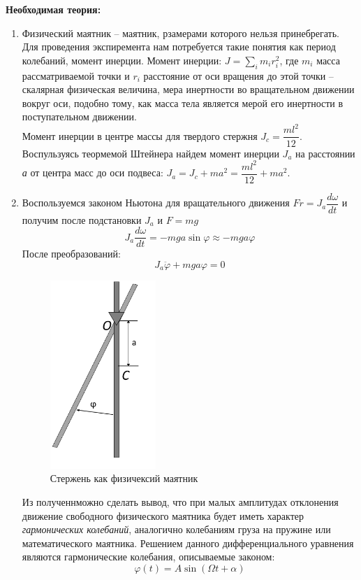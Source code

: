 \documentclass[a4paper, 12pt]{article}
\begin{document}
\textbf{Необходимая теория:}
\begin{enumerate}
\item Физический маятник -- маятник, рзамерами которого нельзя принебрегать. Для проведения экспиремента нам потребуется такие понятия как период колебаний, момент инерции. Момент инерции: $J = \sum_im_ir_i^2$, где $m_i$ масса рассматриваемой точки и $r_i$ расстояние от оси вращения до этой точки -- скалярная физическая величина, мера инертности во вращательном движении вокруг оси, подобно тому, как масса тела является мерой его инертности в поступательном движении.\\Момент инерции в центре массы для твердого стержня $J_c = \dfrac{ml^2}{12}$. Воспульзуясь теормемой Штейнера найдем момент инерции $J_a$ на расстоянии \textit{а} от центра масс до оси подвеса: $J_a = J_c + ma^2 = \dfrac{ml^2}{12} + ma^2$.
\item Воспользуемся законом Ньютона для вращательного движения $Fr = J_a\dfrac{d\omega}{dt}$ и получим после подстановки $J_a$ и $F = mg$
\[J_a\dfrac{d\omega}{dt} = -mga\sin \varphi \approx -mga\varphi\]
После преобразований:
\[J_a\ddot{\varphi}+mga\varphi=0\]
\begin{minipage}{\linewidth}
\begin{figure}
\begin{center}
\includegraphics[width=4cm]{ustanovka}
\end{center}
\caption{Стержень как физичексий маятник}
\end{figure} Из полученнможно сделать вывод,
что при малых амплитудах отклонения движение свободного физического маятника будет иметь характер \textit{гармонических колебаний}, аналогично колебаниям груза на пружине или математического маятника.  Решением
данного дифференциального уравнения являются гармонические колебания, описываемые законом:
\[ \varphi(t) = A\sin (\Omega t + \alpha)\]

\end{minipage}
\end{enumerate}
\end{document}
